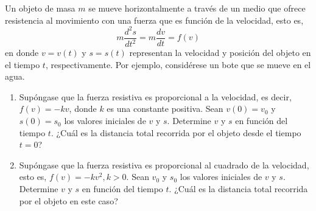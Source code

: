 \item Un objeto de masa $m$ se mueve horizontalmente a través de un medio que ofrece resistencia al movimiento con una fuerza que es función de la velocidad, esto es,
    \[ m \frac{d^2s}{dt^2} = m \frac{dv}{dt} = f(v) \]
    en donde $v = v(t)$ y $s = s(t)$ representan la velocidad y posición del objeto en el tiempo $t$, respectivamente. Por ejemplo, considérese un bote que se mueve en el agua.
    \begin{enumerate}
        \item[(a)] Supóngase que la fuerza resistiva es proporcional a la velocidad, es decir, $f(v) = -kv$, donde $k$ es una constante positiva. Sean $v(0) = v_0$ y $s(0) = s_0$ los valores iniciales de $v$ y $s$. Determine $v$ y $s$ en función del tiempo $t$. ¿Cuál es la distancia total recorrida por el objeto desde el tiempo $t = 0$?
        \item[(b)] Supóngase que la fuerza resistiva es proporcional al cuadrado de la velocidad, esto es, $f(v) = -kv^2, k > 0$. Sean $v_0$ y $s_0$ los valores iniciales de $v$ y $s$. Determine $v$ y $s$ en función del tiempo $t$. ¿Cuál es la distancia total recorrida por el objeto en este caso?
    \end{enumerate}
